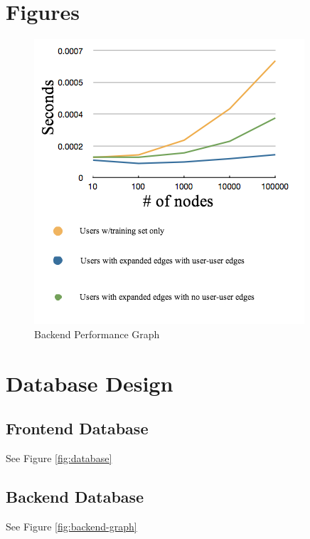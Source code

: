 \documentclass[11pt,letterpaper]{article}
\begin{document}
\section{Figures}
\begin{figure}
\centering
\includegraphics[scale=0.65]{img/recsys-performance-with-legend.png}
\caption{Backend Performance Graph}
\label{fig:test-performance}
\end{figure}



\section{Database Design}
\subsection{Frontend Database}
See Figure \ref{fig:database}
\subsection{Backend Database}
See Figure \ref{fig:backend-graph}


\end{document}
